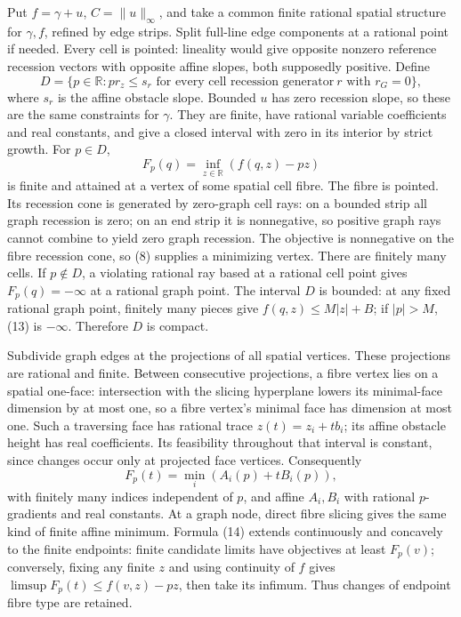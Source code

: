 \documentclass[
  11pt,
]{article}
\begin{document}
Put \(f=\gamma+u\), \(C=\|u\|_\infty\), and take a common finite
rational spatial structure for \(\gamma,f\), refined by edge strips.
Split full-line edge components at a rational point if needed. Every
cell is pointed: lineality would give opposite nonzero reference
recession vectors with opposite affine slopes, both supposedly positive.
Define \[
 D=\{p\in\mathbb R:p r_z\leq s_r\text{ for every cell recession generator}
                                      \ r\text{ with }r_G=0\},           \tag{12}
\] where \(s_r\) is the affine obstacle slope. Bounded \(u\) has zero
recession slope, so these are the same constraints for \(\gamma\). They
are finite, have rational variable coefficients and real constants, and
give a closed interval with zero in its interior by strict growth. For
\(p\in D\), \[
                         F_p(q)=\inf_{z\in\mathbb R}(f(q,z)-pz)          \tag{13}
\] is finite and attained at a vertex of some spatial cell fibre. The
fibre is pointed. Its recession cone is generated by zero-graph cell
rays: on a bounded strip all graph recession is zero; on an end strip it
is nonnegative, so positive graph rays cannot combine to yield zero
graph recession. The objective is nonnegative on the fibre recession
cone, so (8) supplies a minimizing vertex. There are finitely many
cells. If \(p\notin D\), a violating rational ray based at a rational
cell point gives \(F_p(q)=-\infty\) at a rational graph point. The
interval \(D\) is bounded: at any fixed rational graph point, finitely
many pieces give \(f(q,z)\leq M|z|+B\); if \(|p|>M\), (13) is
\(-\infty\). Therefore \(D\) is compact.

Subdivide graph edges at the projections of all spatial vertices. These
projections are rational and finite. Between consecutive projections, a
fibre vertex lies on a spatial one-face: intersection with the slicing
hyperplane lowers its minimal-face dimension by at most one, so a fibre
vertex's minimal face has dimension at most one. Such a traversing face
has rational trace \(z(t)=z_i+t b_i\); its affine obstacle height has
real coefficients. Its feasibility throughout that interval is constant,
since changes occur only at projected face vertices. Consequently \[
 F_p(t)=\min_i(A_i(p)+tB_i(p)),                              \tag{14}
\] with finitely many indices independent of \(p\), and affine
\(A_i,B_i\) with rational \(p\)-gradients and real constants. At a graph
node, direct fibre slicing gives the same kind of finite affine minimum.
Formula (14) extends continuously and concavely to the finite endpoints:
finite candidate limits have objectives at least \(F_p(v)\); conversely,
fixing any finite \(z\) and using continuity of \(f\) gives
\(\limsup F_p(t)\leq f(v,z)-pz\), then take its infimum. Thus changes of
endpoint fibre type are retained.
\end{document}
